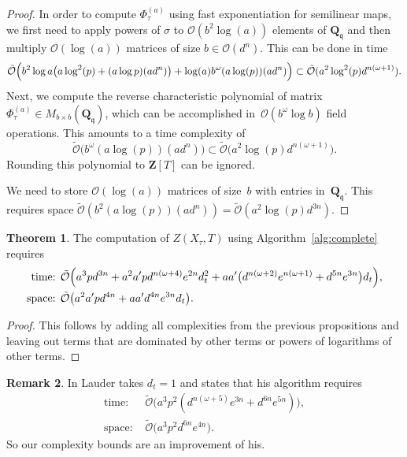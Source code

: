 \documentclass[a4paper,11pt]{article}
\numberwithin{equation}{section}
\newcommand{\ZZ}{\mathbf{Z}} %
\newcommand{\QQ}{\mathbf{Q}} %
\providecommand{\BigOh}{\mathcal{O}}          %
\providecommand{\SoftOh}{\tilde{\mathcal{O}}} %
\theoremstyle{definition}
\newtheorem{thm}{Theorem}[section]
\newtheorem{rem}[thm]{Remark}
\begin{document}
\begin{proof}
In order to compute $\Phi_{\tau}^{(a)}$ using fast exponentiation for 
semilinear maps, we first need to apply powers of $\sigma$ to $\BigOh(b^2 \log(a))$ 
elements of $\QQ_{\mathfrak{q}}$ and then multiply $\BigOh(\log(a))$ matrices 
of size $b \in \BigOh(d^n)$. This can be done in time 
\begin{gather*}
\SoftOh\Bigl( b^2 \log a \bigl( a \log^2(p) + (a \log p)(a d^n)  \bigr) 
    + \log(a) b^{\omega} (a \log(p))(a d^n)  \Bigr) 
\subset \SoftOh(a^2  \log^2(p) d^{n(\omega+1)}).
\end{gather*}
Next, we compute the reverse characteristic polynomial of matrix 
$\Phi_{\tau}^{(a)} \in M_{b \times b}(\QQ_{\mathfrak{q}})$, which 
can be accomplished in~$\BigOh(b^{\omega} \log b)$ field operations. 
This amounts to a time complexity of 
\begin{equation*}
\SoftOh\bigl(b^{\omega} (a \log(p))(a d^n) \bigr)
    \subset \SoftOh\bigl( a^2 \log(p) d^{n(\omega+1)} \bigr).
\end{equation*}
Rounding this polynomial to $\ZZ[T]$ can be ignored.

We need to store $\BigOh(\log(a))$ matrices of size~$b$ with entries 
in~$\QQ_{\mathfrak{q}}$.  This requires space 
$\SoftOh(b^2 (a \log(p)) (a d^n)) = \SoftOh(a^2 \log(p) d^{3n})$.
\end{proof}

\begin{thm}
The computation of $Z(X_{\tau},T)$ using Algorithm~\ref{alg:complete} requires
\begin{align*}
\mbox{time: }  &\SoftOh\Bigl( 
                a^3 p d^{3n} + 
                a^2 a' p d^{n(\omega+4)} e^{2n} d_t^2+
                aa' \bigl(d^{n(\omega+2)} e^{n(\omega+1)}+ d^{5n} e^{3n}\bigr) d_t 
                \Bigr), \\
\mbox{space: } &\SoftOh\bigl( a^2 a' p d^{4n} + a a' d^{4n} e^{3n} d_t \bigr).
\end{align*}
\end{thm}

\begin{proof}
This follows by adding all complexities from the previous propositions and 
leaving out terms that are dominated by other terms or powers of
logarithms of other terms.
\end{proof}

\begin{rem} In \citep{Lauder2004a} Lauder takes $d_t=1$ and states that his
algorithm requires
\begin{align*}
\mbox{time: }  &\SoftOh\bigl(a^3 p^2 (d^{n(\omega+5)} e^{3n} + d^{6n} e^{5n}) \bigr), \\ 
\mbox{space: } &\SoftOh\bigl(a^3 p^2 d^{6n} e^{4n} \bigr).
\end{align*}
So our complexity bounds are an improvement of his.
\end{rem}
\end{document}
